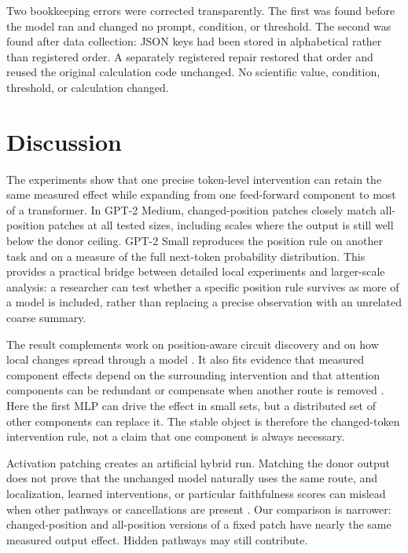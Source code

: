\documentclass[pdflatex,sn-nature]{sn-jnl}
\begin{document}
Two bookkeeping errors were corrected transparently. The first was found
before the model ran and changed no prompt, condition, or threshold. The
second was found after data collection: JSON keys had been stored in
alphabetical rather than registered order. A separately registered repair
restored that order and reused the original calculation code unchanged. No
scientific value, condition, threshold, or calculation changed.

\section{Discussion}\label{sec:discussion}

The experiments show that one precise token-level intervention can retain the
same measured effect while expanding from one feed-forward component to most
of a transformer. In GPT-2 Medium, changed-position patches closely match
all-position patches at all tested sizes, including scales where the output is
still well below the donor ceiling. GPT-2 Small reproduces the position rule
on another task and on a measure of the full next-token probability
distribution. This provides a practical bridge between detailed local
experiments and larger-scale analysis: a researcher can test whether a
specific position rule survives as more of a model is included, rather than
replacing a precise observation with an unrelated coarse summary.

The result complements work on position-aware circuit discovery
\citep{haklay2025position} and on how local changes spread through a model
\citep{olivieri2026field}. It also fits evidence that measured component
effects depend on the surrounding intervention \citep{vaidyanathan2026mediators}
and that attention components can be redundant or compensate when another
route is removed
\citep{michel2019sixteen,mcgrath2023hydra,gong2026coax,vaidyanathan2026hydra}.
Here the first MLP can drive the effect in small sets, but a distributed set of
other components can replace it. The stable object is therefore the
changed-token intervention rule, not a claim that one component is always
necessary.

Activation patching creates an artificial hybrid run. Matching the donor
output does not prove that the unchanged model naturally uses the same route,
and localization, learned interventions, or particular faithfulness scores can
mislead when other pathways or cancellations are present
\citep{heimersheim2024activation,hase2023localization,makelov2024subspace,mueller2024missed,miller2024faithfulness,tanyel2026whose}.
Our comparison is narrower: changed-position and all-position versions of a
fixed patch have nearly the same measured output effect. Hidden pathways may
still contribute.
\end{document}

